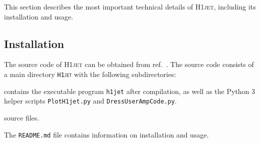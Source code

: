 \documentclass[12pt]{article}
\begin{document}
This section describes the most important technical details of
\textsc{H1jet}, including its installation and usage.

\subsection{Installation} 
The source code of \textsc{H1jet} can be obtained from
ref.~\cite{h1jet}. The source code consists of a main directory
\texttt{\textsc{H1jet}} with the following subdirectories:
\begin{description}[labelindent=1cm, labelwidth =\widthof{\bfseries9999}, leftmargin = !]
	\item[\texttt{bin} :] contains the executable program \texttt{h1jet} after compilation, as well as the Python 3 helper scripts \texttt{PlotH1jet.py} and \texttt{DressUserAmpCode.py}. 
	\item[\texttt{src} :] source files. 
\end{description}
The \texttt{README.md} file contains information on installation and usage. \\
\end{document}
